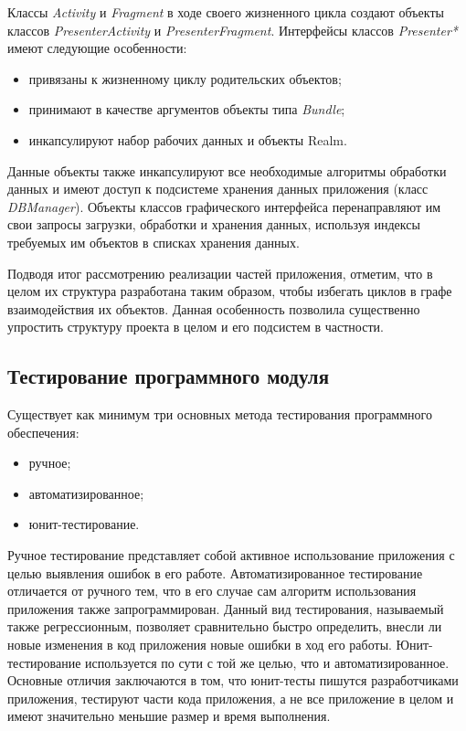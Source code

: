 Классы \textit{Activity} и \textit{Fragment} в ходе своего жизненного цикла
создают объекты классов \textit{PresenterActivity} и \textit{PresenterFragment}.
Интерфейсы классов \textit{Presenter*} имеют следующие особенности:
\begin{itemize}
  \item привязаны к жизненному циклу родительских объектов;
  \item принимают в качестве аргументов объекты типа \textit{Bundle};
  \item инкапсулируют набор рабочих данных и объекты Realm.
\end{itemize}

Данные объекты также инкапсулируют все необходимые алгоритмы обработки данных и
имеют доступ к подсистеме хранения данных приложения (класс \textit{DBManager}).
Объекты классов графического интерфейса перенаправляют
им свои запросы загрузки, обработки и хранения данных,
используя индексы требуемых им объектов в списках хранения данных.

Подводя итог рассмотрению реализации частей приложения, отметим,
что в целом их структура разработана таким образом,
чтобы избегать циклов в графе взаимодействия их объектов.
Данная особенность позволила существенно упростить
структуру проекта в целом и его подсистем в частности.



\subsection{Тестирование программного модуля}

Существует как минимум три основных метода тестирования
программного обеспечения:
\begin{itemize}
\item ручное;
\item автоматизированное;
\item юнит-тестирование.
\end{itemize}

Ручное тестирование представляет собой активное использование приложения
с целью выявления ошибок в его работе.
Автоматизированное тестирование отличается от ручного тем,
что в его случае сам алгоритм использования приложения также запрограммирован.
Данный вид тестирования, называемый также регрессионным,
позволяет сравнительно быстро определить,
внесли ли новые изменения в код приложения новые ошибки в ход его работы.
Юнит-тестирование используется по сути с той же целью,
что и автоматизированное. Основные отличия заключаются в том,
что юнит-тесты пишутся разработчиками приложения,
тестируют части кода приложения, а не все приложение в целом
и имеют значительно меньшие размер и время выполнения.

